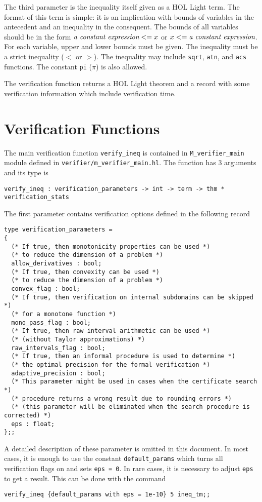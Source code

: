 \documentclass[a4paper]{article}
\begin{document}
The third parameter is the inequality itself given as a HOL Light term. The format of this term is simple: it is an implication with bounds of variables in the antecedent and an inequality in the consequent. The bounds of all variables should be in the form $\text{\it a constant expression} <= x$ or $x <= \text{\it a constant expression}$. For each variable, upper and lower bounds must be given. The inequality must be a strict inequality ($<$ or $>$). The inequality may include \verb|sqrt|, \verb|atn|, and \verb|acs| functions. The constant \verb|pi| ($\pi$) is also allowed.

The verification function returns a HOL Light theorem and a record with some verification information which include verification time.


\section{Verification Functions}\label{verification}
The main verification function \verb|verify_ineq| is contained in \verb|M_verifier_main| module defined in \verb|verifier/m_verifier_main.hl|. The function has 3 arguments and its type is
\begin{verbatim}
verify_ineq : verification_parameters -> int -> term -> thm * verification_stats
\end{verbatim}

The first parameter contains verification options defined in the following record
\begin{verbatim}
type verification_parameters =
{
  (* If true, then monotonicity properties can be used *)
  (* to reduce the dimension of a problem *)
  allow_derivatives : bool;
  (* If true, then convexity can be used *)
  (* to reduce the dimension of a problem *)
  convex_flag : bool;
  (* If true, then verification on internal subdomains can be skipped *)
  (* for a monotone function *)
  mono_pass_flag : bool;
  (* If true, then raw interval arithmetic can be used *)
  (* (without Taylor approximations) *)
  raw_intervals_flag : bool;
  (* If true, then an informal procedure is used to determine *)
  (* the optimal precision for the formal verification *)
  adaptive_precision : bool;
  (* This parameter might be used in cases when the certificate search *)
  (* procedure returns a wrong result due to rounding errors *)
  (* (this parameter will be eliminated when the search procedure is corrected) *)
  eps : float;
};;
\end{verbatim}
A detailed description of these parameter is omitted in this document. In most cases, it is enough to use the constant \verb|default_params| which turns all verification flags on and sets \verb|eps = 0|. In rare cases, it is necessary to adjust \verb|eps| to get a result. This can be done with the command
\begin{verbatim}
verify_ineq {default_params with eps = 1e-10} 5 ineq_tm;;
\end{verbatim}
\end{document}

